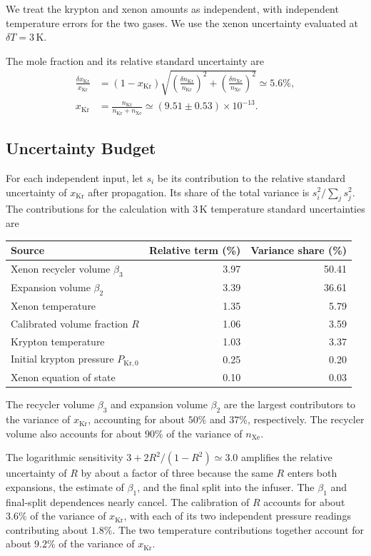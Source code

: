 \documentclass{article}
\begin{document}
\begin{keyidea}
    We treat the krypton and xenon amounts as independent, with independent temperature errors for the two gases. We use the xenon uncertainty evaluated at $\delta T=3\,\mathrm K$.
\end{keyidea}

The mole fraction and its relative standard uncertainty are
\begin{align}
    \frac{\delta x_\mathrm{Kr}}{x_\mathrm{Kr}} &= (1-x_\mathrm{Kr})\sqrt{\left(\frac{\delta n_\mathrm{Kr}}{n_\mathrm{Kr}}\right)^2 + \left(\frac{\delta n_\mathrm{Xe}}{n_\mathrm{Xe}}\right)^2} \simeq 5.6\%, \\
    x_\mathrm{Kr} &= \frac{n_\mathrm{Kr}}{n_\mathrm{Kr}+n_\mathrm{Xe}} \simeq (9.51\pm0.53)\times10^{-13}.
\end{align}

\begin{samepage}
\subsection{Uncertainty Budget}

For each independent input, let $s_i$ be its contribution to the relative standard uncertainty of $x_\mathrm{Kr}$ after propagation. Its share of the total variance is $s_i^2/\sum_j s_j^2$. The contributions for the calculation with $3\,\mathrm K$ temperature standard uncertainties are

\begin{center}
\begin{tabular}{lrr}
Source & Relative term (\%) & Variance share (\%) \\
\hline
Xenon recycler volume $\beta_3$ & 3.97 & 50.41 \\
Expansion volume $\beta_2$ & 3.39 & 36.61 \\
Xenon temperature & 1.35 & 5.79 \\
Calibrated volume fraction $R$ & 1.06 & 3.59 \\
Krypton temperature & 1.03 & 3.37 \\
Initial krypton pressure $P_{\mathrm{Kr},0}$ & 0.25 & 0.20 \\
Xenon equation of state & 0.10 & 0.03
\end{tabular}
\end{center}
\end{samepage}

The recycler volume $\beta_3$ and expansion volume $\beta_2$ are the largest contributors to the variance of $x_\mathrm{Kr}$, accounting for about $50\%$ and $37\%$, respectively. The recycler volume also accounts for about $90\%$ of the variance of $n_\mathrm{Xe}$.

The logarithmic sensitivity $3+2R^2/(1-R^2)\simeq 3.0$ amplifies the relative uncertainty of $R$ by about a factor of three because the same $R$ enters both expansions, the estimate of $\beta_1$, and the final split into the infuser. The $\beta_1$ and final-split dependences nearly cancel. The calibration of $R$ accounts for about $3.6\%$ of the variance of $x_\mathrm{Kr}$, with each of its two independent pressure readings contributing about $1.8\%$. The two temperature contributions together account for about $9.2\%$ of the variance of $x_\mathrm{Kr}$.
\end{document}
